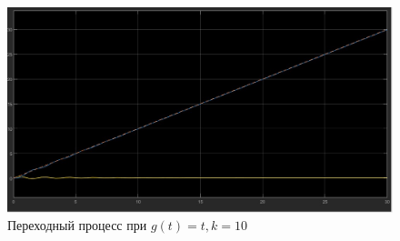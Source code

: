 \documentclass[a4paper, 12pt]{article}
\begin{document}
    \begin{figure}[H]
        \centering
        \includegraphics[scale=0.3]{task_2_g=t_k=10.jpg}
        \captionsetup{skip=0pt}
        \caption{Переходный процесс при $g(t)=t,k=10$}
        \label{fig:t2gtk10}
    \end{figure}
\end{document}
